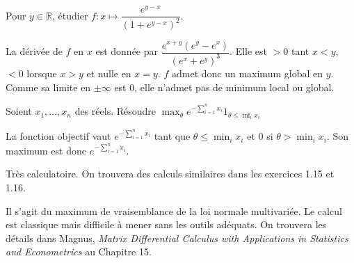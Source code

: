 \documentclass{fancybook}
\begin{document}
\begin{exercice}
Pour $y\in \mathbb R$, étudier $\displaystyle f:x\mapsto \dfrac{e^{y-x}}{(1+e^{y-x})^2} $.
\end{exercice}
La dérivée de $f$ en $x$ est donnée par $\displaystyle \dfrac{e^{x+y} \left(e^y-e^x\right)}{\left(e^x+e^y\right)^3}$.\newline
Elle est $>0$ tant $x< y$, $<0$ lorsque $x> y$ et nulle en $x=y$. $f$ admet donc un maximum global en $y$. Comme sa limite en $\pm \infty$ est $0$, elle n'admet pas de minimum local ou global.\newline

\begin{exercice}
Soient $x_1,\ldots, x_n$ des réels. Résoudre $\max_{\theta} e^{-\sum_{i=1}^n x_i} 1_{\theta \leq \inf_i x_i}$
\end{exercice}
La fonction objectif vaut $e^{-\sum_{i=1}^n x_i}$ tant que $\theta \leq \min_i x_i$ et $0$ si $\theta > \min_i x_i$. Son maximum est donc $e^{-\sum_{i=1}^n x_i}$. 


\begin{exercice}
\end{exercice}
Très calculatoire. On trouvera des calculs similaires dans les exercices 1.15 et 1.16.

\begin{exercice}
\end{exercice}
Il s'agit du maximum de vraisemblance de la loi normale multivariée. Le calcul est classique mais difficile à mener sans les outils adéquats. On trouvera les détails dans Magnus, \textit{Matrix Differential Calculus with Applications in Statistics and Econometrics} au Chapitre 15.
\end{document}
